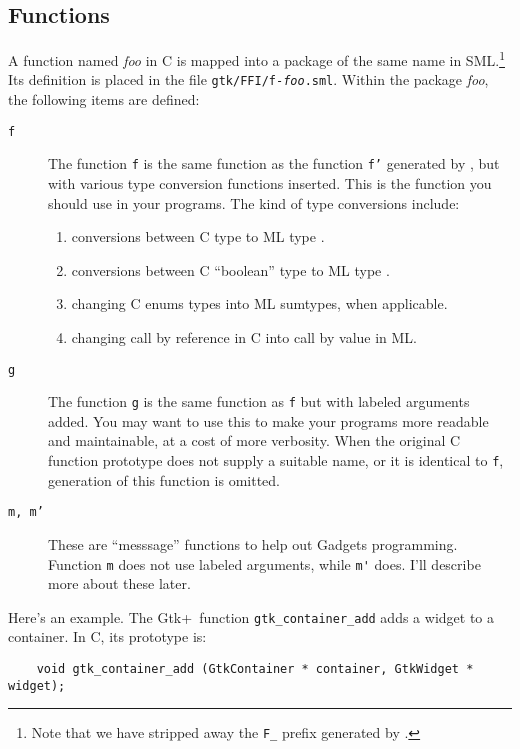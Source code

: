 \documentclass{article}
\newcommand{\gtk}{\mbox{\sf Gtk+}}
\begin{document}
\subsection{Functions}

   A function named {\em foo} in C is mapped into a package of the same name 
in SML.\footnote{Note that we have stripped away the {\tt F\_} prefix
generated by \mlnlffigen.}  
Its definition is placed in the file {\tt gtk/FFI/f-{\em foo}.sml}.
Within the package {\em foo}, the following items are defined:
   \begin{description} 
    \item[\tt f] The function {\tt f} is the same function as 
         the function {\tt f'} generated by \mlnlffigen, but
         with various type conversion functions inserted.  This is 
         the function you should use in your programs.
         The kind of type conversions include:
        \begin{enumerate}
          \item conversions between C type  to 
                ML type .
          \item conversions between C ``boolean'' type to ML type .
          \item changing C enums types into ML sumtypes, when applicable.
          \item changing call by reference in C into call by value in ML.
         \end{enumerate}
    \item[\tt g] The function {\tt g} is the same function as {\tt f}
         but with labeled arguments added.  You may want to use this
         to make your programs more readable and maintainable, at a cost
         of more verbosity.
         When the original C function prototype does not supply a suitable name,
         or it is identical to {\tt f}, generation of this function is omitted.
    \item[\tt m, m'] These are ``messsage'' functions to help
out Gadgets programming.  Function \verb|m| does not use labeled arguments,
while \verb|m'| does.  I'll describe more about these later.
  \end{description}

   Here's an example.  The \gtk\ function \verb|gtk_container_add| adds
a widget to a container.  In C, its prototype is:
\begin{verbatim}
    void gtk_container_add (GtkContainer * container, GtkWidget * widget);
\end{verbatim}
\end{document}
